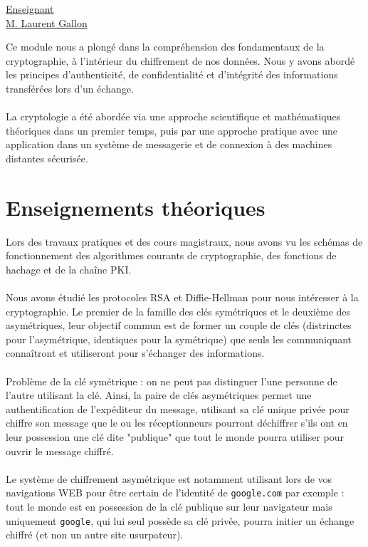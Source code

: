 \renewcommand{\figurename}{}

\vspace*{0.2cm}%
      \large
      \href{}{\color{black}Enseignant\\M. Laurent Gallon}\\%
      \normalsize
\vspace*{0.5cm}%


Ce module nous a plongé dans la compréhension des fondamentaux de la cryptographie, à l'intérieur du chiffrement de nos données. Nous y avons abordé les principes d'authenticité, de confidentialité et d'intégrité des informations transférées lors d'un échange.
\\ \\
La cryptologie a été abordée via une approche scientifique et mathématiques théoriques dans un premier temps, puis par une approche pratique avec une application dans un système de messagerie et de connexion à des machines distantes sécurisée.

\section{Enseignements théoriques}



Lors des travaux pratiques et des cours magistraux, nous avons vu les schémas de fonctionnement des algorithmes courants de cryptographie, des fonctions de hachage et de la chaîne PKI.
\\ \\
Nous avons étudié les protocoles RSA et Diffie-Hellman pour nous intéresser à la cryptographie.  Le premier de la famille des clés symétriques et le deuxième des asymétriques, leur objectif commun est de former un couple de clés (distrinctes pour l'asymétrique, identiques pour la symétrique) que seuls les communiquant connaîtront et utiliseront pour s'échanger des informations.
\\ \\
Problème de la clé symétrique : on ne peut pas distinguer l'une personne de l'autre utilisant la clé. Ainsi, la paire de clés asymétriques permet une authentification de l'expéditeur du message, utilisant sa clé unique privée pour chiffre son message que le ou les réceptionneurs pourront déchiffrer s'ils ont en leur possession une clé dite "publique" que tout le monde pourra utiliser pour ouvrir le message chiffré.
\\ \\
Le système de chiffrement asymétrique est notamment utilisant lors de vos navigations WEB pour être certain de l'identité de \texttt{google.com} par exemple : tout le monde est en possession de la clé publique sur leur navigateur mais uniquement \texttt{google}, qui lui seul possède sa clé privée, pourra initier un échange chiffré (et non un autre site usurpateur).

